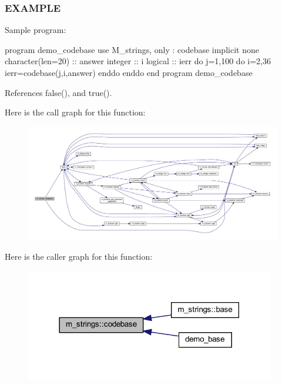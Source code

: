 \subsubsection*{E\+X\+A\+M\+P\+LE}

Sample program\+:

program demo\+\_\+codebase use M\+\_\+strings, only \+: codebase implicit none character(len=20) \+:\+: answer integer \+:\+: i logical \+:\+: ierr do j=1,100 do i=2,36 ierr=codebase(j,i,answer) enddo enddo end program demo\+\_\+codebase 

References false(), and true().

Here is the call graph for this function\+:
\nopagebreak
\begin{figure}[H]
\begin{center}
\leavevmode
\includegraphics[width=350pt]{namespacem__strings_a3a022b64dc902dc6043e3f265ee78e38_cgraph}
\end{center}
\end{figure}
Here is the caller graph for this function\+:
\nopagebreak
\begin{figure}[H]
\begin{center}
\leavevmode
\includegraphics[width=309pt]{namespacem__strings_a3a022b64dc902dc6043e3f265ee78e38_icgraph}
\end{center}
\end{figure}
\mbox{\label{namespacem__strings_a929c032267cb990ad4991fab4aed1d57}} 
